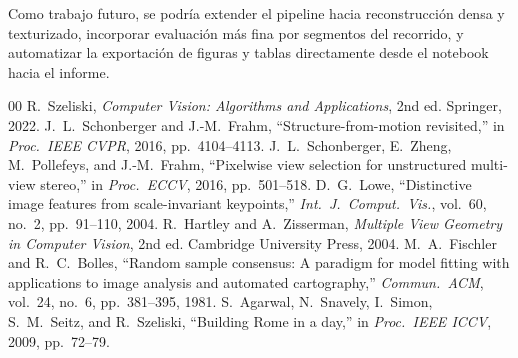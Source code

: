 \documentclass[conference]{IEEEtran}
\begin{document}
Como trabajo futuro, se podr\'ia extender el pipeline hacia reconstrucci\'on densa y texturizado, incorporar evaluaci\'on m\'as fina por segmentos del recorrido, y automatizar la exportaci\'on de figuras y tablas directamente desde el notebook hacia el informe.

\begin{thebibliography}{00}
 R.~Szeliski, \emph{Computer Vision: Algorithms and Applications}, 2nd ed. Springer, 2022.
 J.~L.~Schonberger and J.-M.~Frahm, ``Structure-from-motion revisited,'' in \emph{Proc.\ IEEE CVPR}, 2016, pp.~4104--4113.
 J.~L.~Schonberger, E.~Zheng, M.~Pollefeys, and J.-M.~Frahm, ``Pixelwise view selection for unstructured multi-view stereo,'' in \emph{Proc.\ ECCV}, 2016, pp.~501--518.
 D.~G.~Lowe, ``Distinctive image features from scale-invariant keypoints,'' \emph{Int.\ J.\ Comput.\ Vis.}, vol.~60, no.~2, pp.~91--110, 2004.
 R.~Hartley and A.~Zisserman, \emph{Multiple View Geometry in Computer Vision}, 2nd ed. Cambridge University Press, 2004.
 M.~A.~Fischler and R.~C.~Bolles, ``Random sample consensus: A paradigm for model fitting with applications to image analysis and automated cartography,'' \emph{Commun.\ ACM}, vol.~24, no.~6, pp.~381--395, 1981.
 S.~Agarwal, N.~Snavely, I.~Simon, S.~M.~Seitz, and R.~Szeliski, ``Building Rome in a day,'' in \emph{Proc.\ IEEE ICCV}, 2009, pp.~72--79.
\end{thebibliography}
\end{document}
